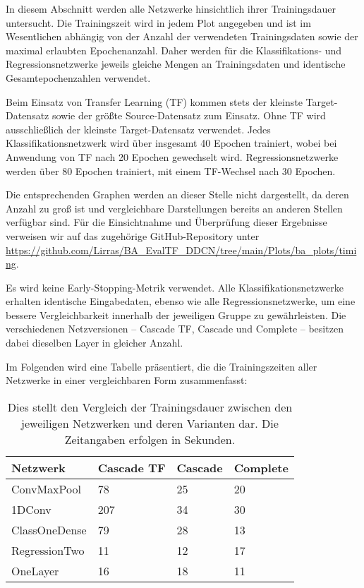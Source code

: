 In diesem Abschnitt werden alle Netzwerke hinsichtlich ihrer Trainingsdauer untersucht. Die Trainingszeit wird in jedem Plot angegeben und ist im Wesentlichen abhängig von der Anzahl der verwendeten Trainingsdaten sowie der maximal erlaubten Epochenanzahl. Daher werden für die 
Klassifikations- und Regressionsnetzwerke jeweils gleiche Mengen an Trainingsdaten und identische Gesamtepochenzahlen verwendet.

Beim Einsatz von Transfer Learning (TF) kommen stets der kleinste Target-Datensatz sowie der größte Source-Datensatz zum Einsatz. Ohne TF wird 
ausschließlich der kleinste Target-Datensatz verwendet. Jedes Klassifikationsnetzwerk wird über insgesamt 40 Epochen trainiert, wobei bei 
Anwendung von TF nach 20 Epochen gewechselt wird. Regressionsnetzwerke werden über 80 Epochen trainiert, mit einem TF-Wechsel nach 30 Epochen.

Die entsprechenden Graphen werden an dieser Stelle nicht dargestellt, da deren Anzahl zu groß ist und vergleichbare Darstellungen bereits an 
anderen Stellen verfügbar sind. Für die Einsichtnahme und Überprüfung dieser Ergebnisse verweisen wir auf das zugehörige GitHub-Repository 
unter \url{https://github.com/Lirras/BA_EvalTF_DDCN/tree/main/Plots/ba_plots/timing}. 

Es wird keine Early-Stopping-Metrik verwendet. Alle Klassifikationsnetzwerke erhalten identische Eingabedaten, ebenso wie alle 
Regressionsnetzwerke, um eine bessere Vergleichbarkeit innerhalb der jeweiligen Gruppe zu gewährleisten. Die verschiedenen Netzversionen – 
Cascade TF, Cascade und Complete – besitzen dabei dieselben Layer in gleicher Anzahl.

Im Folgenden wird eine Tabelle präsentiert, die die Trainingszeiten aller Netzwerke in einer vergleichbaren Form zusammenfasst:

\begin{table}[h!]
    \begin{center} 
        \begin{tabular}{l|l|l|l}
            \textbf{Netzwerk} & \textbf{Cascade TF} & \textbf{Cascade} & \textbf{Complete} \\
            \hline
            ConvMaxPool & 78 & 25 & 20 \\
            1DConv & 207 & 34 & 30 \\
            ClassOneDense & 79 & 28 & 13 \\
            RegressionTwo & 11 & 12 & 17 \\
            OneLayer & 16 & 18 & 11
        \end{tabular}
        \caption{
            \small{Dies stellt den Vergleich der Trainingsdauer zwischen den jeweiligen Netzwerken und deren Varianten dar. Die Zeitangaben erfolgen in Sekunden.}}
        \label{tab:time}
    \end{center}
\end{table}

